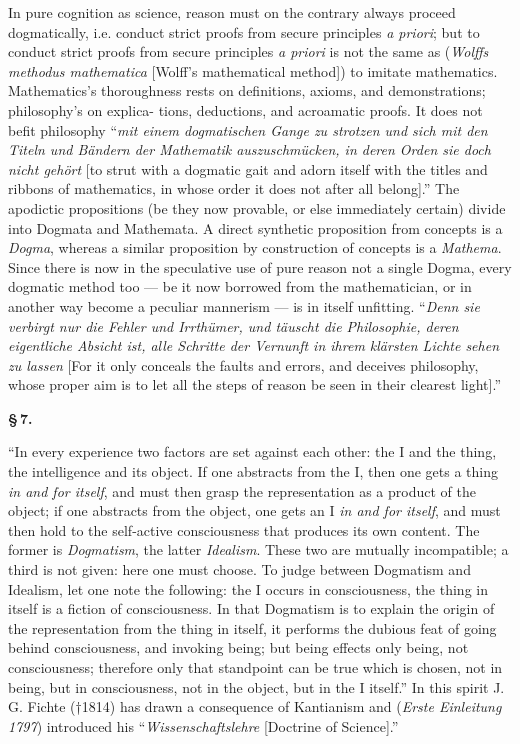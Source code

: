 \documentclass[12pt]{book}
\begin{document}
In pure cognition as science, reason must on the contrary always proceed
dogmatically, i.e. conduct strict proofs from secure principles \textit{a priori};
but to conduct strict proofs from secure principles \textit{a priori} is not the
same as (\textit{Wolffs methodus mathematica} [Wolff's mathematical method]) to
imitate mathematics. Mathematics's thoroughness rests on definitions, axioms, and
demonstrations; philosophy's on explica-
tions, deductions, and acroamatic proofs. It does not befit philosophy
``\textit{mit einem dogmatischen Gange zu strotzen und sich mit den Titeln und
Bändern der Mathematik auszuschmücken, in deren Orden sie doch nicht gehört} [to
strut with a dogmatic gait and adorn itself with the titles and ribbons of
mathematics, in whose order it does not after all belong].'' The apodictic
propositions (be they now provable, or else immediately certain) divide into
Dogmata and Mathemata. A direct synthetic proposition from concepts is a
\emph{Dogma}, whereas a similar proposition by construction of concepts is a
\emph{Mathema}. Since there is now in the speculative use of pure reason not a
single Dogma, every dogmatic method too --- be it now borrowed from the
mathematician, or in another way become a peculiar mannerism --- is in itself
unfitting. ``\textit{Denn sie verbirgt nur die Fehler und Irrthümer, und täuscht
die Philosophie, deren eigentliche Absicht ist, alle Schritte der Vernunft in
ihrem klärsten Lichte sehen zu lassen} [For it only conceals the faults and
errors, and deceives philosophy, whose proper aim is to let all the steps of
reason be seen in their clearest light].''

\begin{center}{\bfseries \S\,7.}\end{center}

``In every experience two factors are set against each other: the I and the thing,
the intelligence and its object. If one abstracts from the I, then one gets a thing
\emph{in and for itself}, and must then grasp the representation as a product of
the object; if one abstracts from the object, one gets an I \emph{in and for
itself}, and must then hold to the self-active consciousness that produces its own
content. The former is \emph{Dogmatism}, the latter \emph{Idealism}. These two are
mutually incompatible; a third is not given: here one must choose. To judge between
Dogmatism and Idealism, let one note the following: the I occurs in consciousness,
the thing in itself is a fiction of consciousness. In that Dogmatism is to explain
the origin of the representation from the thing in itself, it performs the dubious
feat of going behind consciousness, and invoking being; but being effects only
being, not consciousness; therefore only that standpoint can be true which is
chosen, not in being, but in consciousness,
not in the object, but in the I itself.'' In this spirit J. G. Fichte (†1814) has
drawn a consequence of Kantianism and (\textit{Erste Einleitung 1797}) introduced
his ``\textit{Wissenschaftslehre} [Doctrine of Science].''
\end{document}
